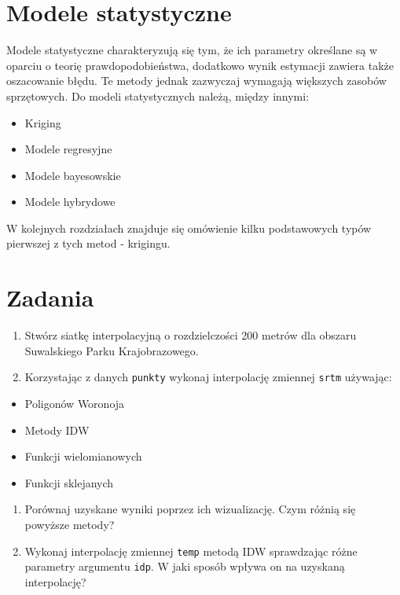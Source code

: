 \documentclass[
  paper=6in:9in,pagesize=pdftex,headinclude=on,footinclude=on,10pt]{scrbook}
\providecommand{\tightlist}{%
  \setlength{\itemsep}{0pt}\setlength{\parskip}{0pt}}
\begin{document}
\section{Modele statystyczne}\label{modele-statystyczne}

Modele statystyczne charakteryzują się tym, że ich parametry określane są w oparciu o teorię prawdopodobieństwa, dodatkowo wynik estymacji zawiera także oszacowanie błędu.
Te metody jednak zazwyczaj wymagają większych zasobów sprzętowych.
Do modeli statystycznych należą, między innymi:

\begin{itemize}
\tightlist
\item
  Kriging
\item
  Modele regresyjne
\item
  Modele bayesowskie
\item
  Modele hybrydowe
\end{itemize}

W kolejnych rozdziałach znajduje się omówienie kilku podstawowych typów pierwszej z tych metod - krigingu.

\section{Zadania}\label{z5}

\begin{enumerate}
\def\labelenumi{\arabic{enumi}.}
\tightlist
\item
  Stwórz siatkę interpolacyjną o rozdzielczości 200 metrów dla obszaru Suwalskiego Parku Krajobrazowego.
\item
  Korzystając z danych \texttt{punkty} wykonaj interpolację zmiennej \texttt{srtm} używając:
\end{enumerate}

\begin{itemize}
\tightlist
\item
  Poligonów Woronoja
\item
  Metody IDW
\item
  Funkcji wielomianowych
\item
  Funkcji sklejanych
\end{itemize}

\begin{enumerate}
\def\labelenumi{\arabic{enumi}.}
\setcounter{enumi}{2}
\tightlist
\item
  Porównaj uzyskane wyniki poprzez ich wizualizację.
  Czym różnią się powyższe metody?
\item
  Wykonaj interpolację zmiennej \texttt{temp} metodą IDW sprawdzając różne parametry argumentu \texttt{idp}.
  W jaki sposób wpływa on na uzyskaną interpolację?
\end{enumerate}
\end{document}
